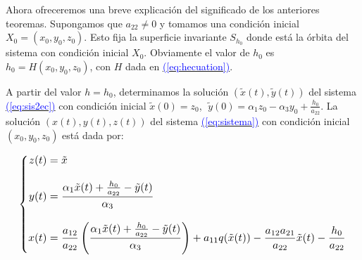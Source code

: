 \documentclass[12pt,a4paper]{report} %
\newcommand{\eref}[1]{\hyperref[#1]{\textcolor{blue}{(\ref*{#1})}}}
\newcommand{\eref}[1]{\hyperref[#1]{\textcolor{blue}{\textit{(\ref*{#1})}}}}
\begin{document}
	\vspace{0.5cm}Ahora ofreceremos una breve explicación del significado de los anteriores teoremas. Supongamos que $a_{22}\neq 0$ y tomamos una condición inicial $X_0=(x_0,y_0,z_0)$. Esto fija la superficie invariante $S_{h_0}$ donde está la órbita del sistema con condición inicial $X_0$. Obviamente el valor de $h_0$ es $h_0=H(x_0,y_0,z_0)$, con $H$ dada en \eref{eq:hecuation}.
	
	\vspace{0.5cm}A partir del valor $h=h_0$, determinamos la solución $\left( \tilde{x}(t),\tilde{y}(t) \right)$ del sistema \eref{eq:sis2ec} con condición inicial $\tilde{x}(0)=z_0$, $\; \tilde{y}(0)=\alpha_1z_0-\alpha_3y_0+\frac{h_0}{a_{22}}$. La solución $(x(t),y(t),z(t))$ del sistema \eref{eq:sistema} con condición inicial $(x_0,y_0,z_0)$ está dada por:
	
	\begin{equation}
		\label{eq:solsis}
		\scalebox{1.1}{$\displaystyle
			\left\{
			\begin{aligned}
				z(t)&=\tilde{x} \\[3mm]
				y(t)&= \frac{\alpha_1\tilde{x}(t)+\frac{h_0}{a_{22}}-\tilde{y}(t)}{\alpha_3}\\[3mm]
				x(t)&=\frac{a_{12}}{a_{22}}\left( \frac{\alpha_1\tilde{x}(t)+\frac{h_0}{a_{22}}-\tilde{y}(t)}{\alpha_3} \right) +a_{11}q(\tilde{x}(t))-\frac{a_{12}a_{21}}{a_{22}}\tilde{x}(t)-\frac{h_0}{a_{22}}
			\end{aligned}
			\right.
			$}
	\end{equation}\smallskip
	

	
\end{document}
